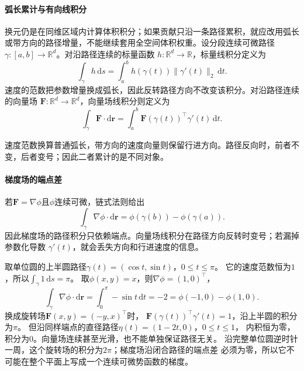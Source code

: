 \paragraph{弧长累计与有向线积分}

换元仍是在同维区域内计算体积积分；如果贡献只沿一条路径累积，就应改用弧长或带方向的路径增量，不能继续套用全空间体积权重。设分段连续可微路径$\gamma:[a,b]\to\mathbb{R}^d$。对沿路径连续的标量函数
$h:\mathbb{R}^d\to\mathbb{R}$，标量线积分定义为
\[
  \int_\gamma h\,\mathrm{d}s
  =
  \int_a^b h(\gamma(t))\lVert\gamma'(t)\rVert_2\,\mathrm{d}t.
\]
速度的范数把参数增量换成弧长，因此反转路径方向不改变该积分。对沿路径连续的向量场
$\bm{F}:\mathbb{R}^d\to\mathbb{R}^d$，向量场线积分则定义为
\[   \int_{\gamma}\bm{F}\mathbin{\cdot}\mathrm{d}\bm{r}   =   \int_a^b   \bm{F}(\gamma(t))^{\top}\gamma'(t)\,\mathrm{d}t. \]

速度范数换算普通弧长，带方向的速度向量则保留行进方向。路径反向时，前者不变，后者变号；因此二者累计的是不同对象。

\paragraph{梯度场的端点差}

若$\bm{F}=\nabla\phi$且$\phi$连续可微，链式法则给出
\begin{equation}
  \int_{\gamma}\nabla\phi\mathbin{\cdot}\mathrm{d}\bm{r}
  =
  \phi(\gamma(b))-\phi(\gamma(a)).
\label{eq:analysis-line-integral-gradient}
\end{equation}
因此梯度场的路径积分只依赖端点。向量场线积分在路径方向反转时变号；若漏掉参数化导数
$\gamma'(t)$，就会丢失方向和行进速度的信息。

\begin{example}
\label{ex:analysis-path-integral-comparison}
取单位圆的上半圆路径$\gamma(t)=(\cos t,\sin t)$，$0\leq t\leq\pi$。
它的速度范数恒为$1$，所以$\int_\gamma1\,\mathrm ds=\pi$。
取$\phi(x,y)=x$，则$\nabla\phi=(1,0)^\top$，
\[
 \int_\gamma\nabla\phi\mathbin{\cdot}\mathrm d\bm r
 =\int_0^\pi-\sin t\,\mathrm dt=-2
 =\phi(-1,0)-\phi(1,0).
\]
换成旋转场$\bm F(x,y)=(-y,x)^\top$时，
$\bm F(\gamma(t))^\top\gamma'(t)=1$，沿上半圆的积分为$\pi$。
但沿同样端点的直径路径$\eta(t)=(1-2t,0)$，$0\leq t\leq1$，
内积恒为零，积分为$0$。向量场连续甚至光滑，也不能单独保证路径无关。
沿完整单位圆逆时针一周，这个旋转场的积分为$2\pi$；梯度场沿闭合路径的端点差
必须为零，所以它不可能在整个平面上写成一个连续可微势函数的梯度。
\end{example}

